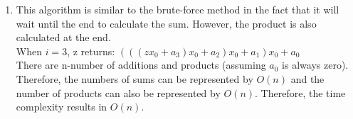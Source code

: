 \documentclass[11pt]{article}
\newenvironment{qparts}{\begin{enumerate}[{(}a{)}]}{\end{enumerate}}
\begin{document}
\begin{qparts}
TERMINATION:\\
At termination, z returns with the value after n loops: $x_{0}^{n}a_{n} +...+ x_{0}a_{1} + a_{0})$\\
This is the same format as $p(x_{0})$.\\
True.

\item
This algorithm is similar to the brute-force method in the fact that it will wait until the end to calculate the sum. However, the product is also calculated at the end. \\
When $i = 3$, z returns: $(((zx_{0} + a_{3})x_{0} + a_{2})x_{0} + a_{1})x_{0} + a_{0}$\\
There are n-number of additions and products (assuming $a_{0}$ is always zero). \\
Therefore, the numbers of sums can be represented by $O(n)$ and the number of products can also be represented by $O(n)$. Therefore, the time complexity results in $O(n)$.

\end{qparts}
\newpage
\end{document}
